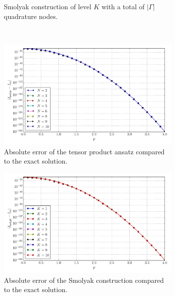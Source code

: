 \documentclass[a4paper,10pt]{article}
\begin{document}
\begin{figure}[ht!]
\begin{subfigure}[t]{0.5\linewidth}
    \caption{Smolyak construction of level $K$ with a total of $|\Gamma|$ quadrature nodes.}
    \label{fig:tp_sg_3d_conv_p_000_000_val_nsd_gk}
  \end{subfigure} \\
  \begin{subfigure}[t]{0.5\linewidth}
    \includegraphics[width=\linewidth]{./plots/tp_sg_3d_conv_p_(0,0,0)_(0,0,0)_err_nsd_tp.pdf}
    \caption{Absolute error of the tensor product ansatz compared to the exact solution.}
    \label{fig:tp_sg_3d_conv_p_000_000_err_nsd_tp}
  \end{subfigure}
  \begin{subfigure}[t]{0.5\linewidth}
    \includegraphics[width=\linewidth]{./plots/tp_sg_3d_conv_p_(0,0,0)_(0,0,0)_err_nsd_gk.pdf}
    \caption{Absolute error of the Smolyak construction compared to the exact solution.}
    \label{fig:tp_sg_3d_conv_p_000_000_err_nsd_gk}
  \end{subfigure}
  \begin{subfigure}[t]{0.5\linewidth}

\end{subfigure}
\end{figure}
\end{document}
